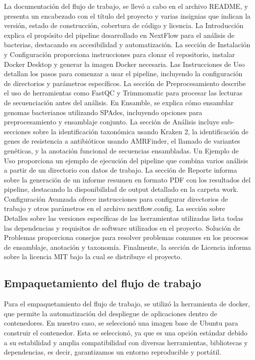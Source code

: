 \documentclass[12pt]{article}
\begin{document}
La documentación del flujo de trabajo, se llevó a cabo en el 
archivo README, y  presenta un encabezado con el título 
del proyecto y varias insignias que indican la versión, 
estado de construcción, cobertura de código y licencia. 
La Introducción explica el propósito del pipeline 
desarrollado en NextFlow para el análisis de bacterias, 
destacando su accesibilidad y automatización. La sección 
de Instalación y Configuración proporciona instrucciones 
para clonar el repositorio, instalar Docker Desktop y 
generar la imagen Docker necesaria. Las Instrucciones de 
Uso detallan los pasos para comenzar a usar el pipeline, 
incluyendo la configuración de directorios y parámetros 
específicos. La sección de Preprocesamiento describe el 
uso de herramientas como FastQC y Trimmomatic para procesar 
las lecturas de secuenciación antes del análisis. 
En Ensamble, se explica cómo ensamblar genomas 
bacterianos utilizando SPAdes, incluyendo opciones 
para preprocesamiento y ensamblaje conjunto. La sección 
de Análisis incluye sub-secciones sobre la 
identificación taxonómica usando Kraken 2, la 
identificación de genes de resistencia a antibióticos 
usando AMRFinder, el llamado de variantes genéticas, y 
la anotación funcional de secuencias ensambladas. 
Un Ejemplo de Uso proporciona un ejemplo de ejecución 
del pipeline que combina varios análisis a partir de 
un directorio con datos de trabajo. La sección de 
Reporte informa sobre la generación de un informe 
resumen en formato PDF con los resultados del pipeline, 
destacando la disponibilidad de output detallado en la 
carpeta work. Configuración Avanzada ofrece instrucciones 
para configurar directorios de trabajo y otros parámetros 
en el archivo nextflow.config. La sección sobre Detalles 
sobre las versiones específicas de las herramientas 
utilizadas lista todas las dependencias y requisitos de 
software utilizados en el proyecto. Solución de Problemas 
proporciona consejos para resolver problemas comunes en 
los procesos de ensamblaje, anotación y taxonomía. 
Finalmente, la sección de Licencia informa sobre la 
licencia MIT bajo la cual se distribuye el proyecto. 

\subsection{Empaquetamiento del flujo de trabajo}

Para el empaquetamiento del flujo de trabajo, se 
utilizó la herramienta de docker, que permite la 
automatización del despliegue de aplicaciones dentro de  
contenedores. En nuestro caso, se seleccionó una imagen 
base de Ubuntu para construir el contenedor. Esta se 
seleccionó, ya que es una opción estándar debido a su 
estabilidad y amplia compatibilidad con diversas herramientas, 
bibliotecas y dependencias, es decir, garantizamos un 
entorno reproducible y portátil.
\end{document}
